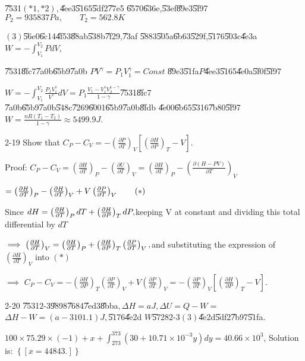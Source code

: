 \documentclass{article}
\begin{document}
\U{7531}$\left( \ast 1,\ast 2\right) ,$\U{4ee3}\U{5165}\U{5df2}\U{77e5}%
\U{6570}\U{636e},\U{53ef}\U{89e3}\U{5f97}\qquad $P_{2}=935837\unit{Pa}%
,\qquad T_{2}=562.8\unit{K}$

$\left( 3\right) $\U{56e0}\U{6c14}\U{4f53}\U{88ab}\U{538b}\U{7f29},\U{73af}%
\U{5883}\U{505a}\U{6b63}\U{529f},\U{5176}\U{503c}\U{4e3a}$%
W=-\int_{V_{1}}^{V_{2}}PdV,$

\U{7531}\U{8fc7}\U{7a0b}\U{65b9}\U{7a0b} $PV^{\gamma }=P_{1}V_{1}^{\gamma
}=Const$ \U{89e3}\U{51fa}$P$\U{4ee3}\U{5165}\U{4e0a}\U{5f0f}\U{5f97}

$W=-\int_{V_{1}}^{V_{2}}\frac{P_{1}V_{1}^{\gamma }}{V^{\gamma }}dV=P_{1}%
\frac{V_{1}-V_{1}^{\gamma }V_{2}^{1-\gamma }}{1-\gamma }$\U{7531}\U{8fc7}%
\U{7a0b}\U{65b9}\U{7a0b}\U{548c}\U{7269}\U{6001}\U{65b9}\U{7a0b}\U{8fdb}%
\U{4e00}\U{6b65}\U{5316}\U{7b80}\U{5f97}$W=\frac{nR\left( T_{1}-T_{2}\right) 
}{1-\gamma }\approx 5499.9\unit{J}.$

2-19 Show that $C_{P}-C_{V}=-\left( \frac{\partial P}{\partial T}\right) _{V}%
\left[ \left( \frac{\partial H}{\partial P}\right) _{T}-V\right] .$

Proof: $C_{P}-C_{V}=\left( \frac{\partial H}{\partial T}\right) _{P}-\left( 
\frac{\partial U}{\partial T}\right) _{V}=\left( \frac{\partial H}{\partial T%
}\right) _{P}-\left( \frac{\partial \left( H-PV\right) }{\partial T}\right)
_{V}$

$=\left( \frac{\partial H}{\partial T}\right) _{P}-\left( \frac{\partial H}{%
\partial T}\right) _{V}+V\left( \frac{\partial P}{\partial T}\right)
_{V}\qquad \left( \ast \right) $

Since $dH=\left( \frac{\partial H}{\partial T}\right) _{P}dT+\left( \frac{%
\partial H}{\partial P}\right) _{T}dP,$keeping V at constant and dividing
this total differential by $dT$

$\implies \left( \frac{\partial H}{\partial T}\right) _{V}=\left( \frac{%
\partial H}{\partial T}\right) _{P}+\left( \frac{\partial H}{\partial P}%
\right) _{T}\left( \frac{\partial P}{\partial T}\right) _{V},$and
substituting the expression of $\left( \frac{\partial H}{\partial T}\right)
_{V}$ into $\left( \ast \right) $

$\implies $ $C_{P}-C_{V}=-\left( \frac{\partial H}{\partial P}\right)
_{T}\left( \frac{\partial P}{\partial T}\right) _{V}+V\left( \frac{\partial P%
}{\partial T}\right) _{V}=-\left( \frac{\partial P}{\partial T}\right) _{V}%
\left[ \left( \frac{\partial H}{\partial P}\right) _{T}-V\right] .$

2-20 \U{7531}$2$-3\U{9898}\U{7684}\U{7ed3}\U{8bba}$,\Delta H=a\unit{J}%
,\Delta U=Q-W=$ $\Delta H-W=\left( a-3101.1\right) \unit{J},$\U{5176}\U{4e2d}%
$W$\U{5728}2-3$\left( 3\right) $\U{4e2d}\U{5df2}\U{7b97}\U{51fa}$.$

$100\times 75.29\times (-1)+x+\int_{273}^{373}(30+10.71\times
10^{-3}y)dy=40.66\times 10^{3}$, Solution is: $\left\{ \left[ x=44843.\right]
\right\} $
\end{document}
